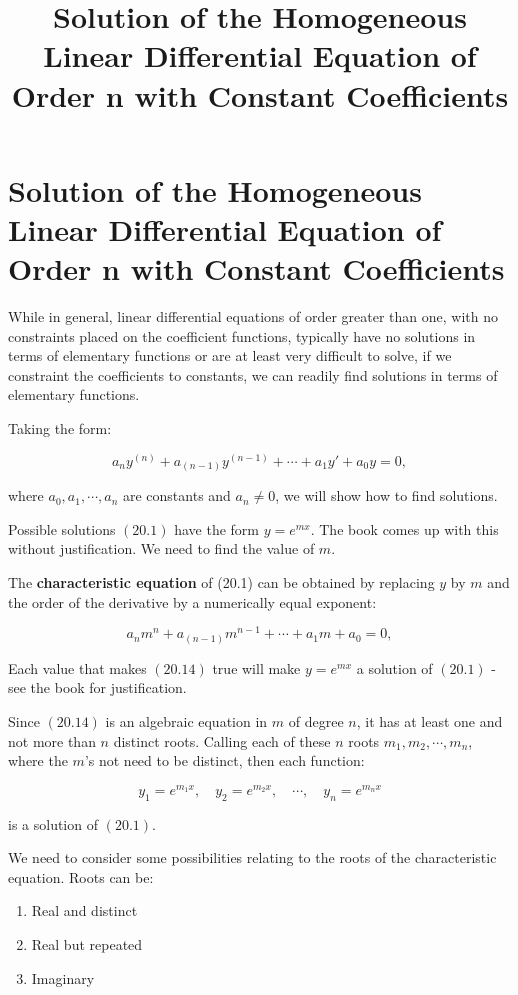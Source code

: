 \documentclass{article}
\title{Solution of the Homogeneous Linear Differential Equation of Order n with Constant Coefficients}
\begin{document}
\section{Solution of the Homogeneous Linear Differential Equation of Order n with Constant Coefficients}

While in general, linear differential equations of order greater than one, with no constraints placed on the coefficient functions, typically have no solutions in terms of elementary functions or are at least very difficult to solve, if we constraint the coefficients to constants, we can readily find solutions in terms of elementary functions.

Taking the form:

\[ \tag{20.1} a_ny^{(n)} + a_{(n-1)}y^{(n-1)} + \cdots + a_1y' + a_0y = 0, \]

where $a_0,a_1,\cdots,a_n$ are constants and $a_n \neq 0$, we will show how to find solutions.

Possible solutions $(20.1)$ have the form $y = e^{mx}$. The book comes up with this without justification. We need to find the value of $m$.

The \textbf{characteristic equation} of (20.1) can be obtained by replacing $y$ by $m$ and the order of the derivative by a numerically equal exponent:

\[ \tag{20.14} a_nm^{n} + a_{(n-1)}m^{n-1} + \cdots + a_1m + a_0 = 0, \]

Each value that makes $(20.14)$ true will make $y = e^{mx}$ a solution of $(20.1)$ - see the book for justification.

Since $(20.14)$ is an algebraic equation in $m$ of degree $n$, it has at least one and not more than $n$ distinct roots. Calling each of these $n$ roots $m_1,m_2,\cdots,m_n$, where the $m$'s not need to be distinct, then each function:

\[ \tag{20.15} y_1 = e^{m_1 x}, \quad y_2 = e^{m_2 x}, \quad \cdots, \quad y_n = e^{m_n x} \]

is a solution of $(20.1)$.

We need to consider some possibilities relating to the roots of the characteristic equation. Roots can be:

\begin{enumerate}
\item Real and distinct
\item Real but repeated
\item Imaginary
\end{enumerate}
\end{document}
